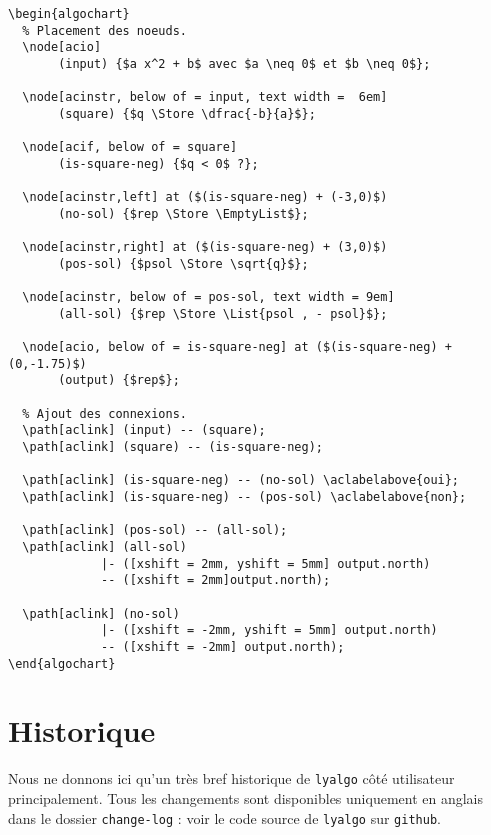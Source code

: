 \documentclass[12pt,a4paper]{article}
\theoremstyle{definition}
\newenvironment{frame-gene}[1][]{
	\begin{tcolorbox}[
		title        = #1, 
		colbacktitle = black!10!white, 
		colback      = white, 
		coltitle     = black,
		fonttitle    = \bfseries\itshape\small, 
		breakable,
		center title]
}{
	\end{tcolorbox}
}
\begin{document}
\begin{frame-gene}
\begin{verbatim}
\begin{algochart}
  % Placement des noeuds.
  \node[acio]
       (input) {$a x^2 + b$ avec $a \neq 0$ et $b \neq 0$};

  \node[acinstr, below of = input, text width =  6em]
       (square) {$q \Store \dfrac{-b}{a}$};

  \node[acif, below of = square]
       (is-square-neg) {$q < 0$ ?};

  \node[acinstr,left] at ($(is-square-neg) + (-3,0)$)
       (no-sol) {$rep \Store \EmptyList$};

  \node[acinstr,right] at ($(is-square-neg) + (3,0)$)
       (pos-sol) {$psol \Store \sqrt{q}$};

  \node[acinstr, below of = pos-sol, text width = 9em]
       (all-sol) {$rep \Store \List{psol , - psol}$};

  \node[acio, below of = is-square-neg] at ($(is-square-neg) + (0,-1.75)$)
       (output) {$rep$};

  % Ajout des connexions.
  \path[aclink] (input) -- (square);
  \path[aclink] (square) -- (is-square-neg);

  \path[aclink] (is-square-neg) -- (no-sol) \aclabelabove{oui};
  \path[aclink] (is-square-neg) -- (pos-sol) \aclabelabove{non};

  \path[aclink] (pos-sol) -- (all-sol);
  \path[aclink] (all-sol)
             |- ([xshift = 2mm, yshift = 5mm] output.north)
             -- ([xshift = 2mm]output.north);

  \path[aclink] (no-sol)
             |- ([xshift = -2mm, yshift = 5mm] output.north)
             -- ([xshift = -2mm] output.north);
\end{algochart}
\end{verbatim}
\end{frame-gene}




\section{Historique}

Nous ne donnons ici qu'un très bref historique de \verb+lyalgo+ côté utilisateur principalement.
Tous les changements sont disponibles uniquement en anglais dans le dossier \verb+change-log+ : voir le code source de \verb+lyalgo+ sur \verb+github+.
\end{document}
